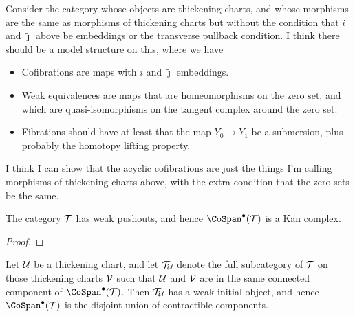 \begin{wild-speculation}\label{model-category}
Consider the category whose objects are thickening charts, and whose morphisms are the same as morphisms of thickening charts but without the condition that $i$ and $\widetilde{\jmath}$ above be embeddings or the transverse pullback condition. I think there should be a model structure on this, where we have
\begin{itemize}

\item Cofibrations are maps with $i$ and $\widetilde{\jmath}$ embeddings.

\item Weak equivalences are maps that are homeomorphisms on the zero set, and which are quasi-isomorphisms on the tangent complex \jake{[to be defined]} around the zero set.

\item Fibrations should have at least that the map $Y_0 \to Y_1$ be a submersion, plus probably the homotopy lifting property.

\end{itemize}
I think I can show that the acyclic cofibrations are just the things I'm calling morphisms of thickening charts above, with the extra condition that the zero sets be the same.
\end{wild-speculation}

\begin{remark}
\end{remark}

\begin{prop}\label{weak-pullback-charts}
The category $\mathcal T$ has weak pushouts, and hence $\CoSpan^\bullet(\cT)$ is a Kan complex. 
\end{prop}

\begin{proof}
\jake{[To be done.]}
\end{proof}

\begin{prop}\label{weak-initial-charts}
Let $\mathcal U$ be a thickening chart, and let $\mathcal T_\mathcal U$ denote the full subcategory of $\mathcal T$ on those thickening charts $\mathcal V$ such that $\mathcal U$ and $\mathcal V$ are in the same connected component of $\CoSpan^\bullet(\cT)$. Then $\mathcal T_\mathcal U$ has a weak initial object, and hence $\CoSpan^\bullet(\cT)$ is the disjoint union of contractible components. 
\end{prop}

